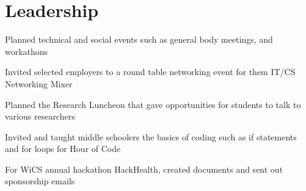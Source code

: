 \section{Leadership}

\begin{tightemize}
\item Planned technical and social events such as general body meetings, and workathons
\item Invited selected employers to a round table networking event for them {\selectfont IT/CS Networking Mixer}
\item Planned the {\selectfont Research Luncheon} that gave opportunities for students to talk to various researchers
\item Invited and taught middle schoolers the basics of coding such as if statements and for loops for {\selectfont Hour of Code}
\item For WiCS annual hackathon {\selectfont HackHealth}, created documents and sent out sponsorship emails


\end{tightemize}
\sectionsep